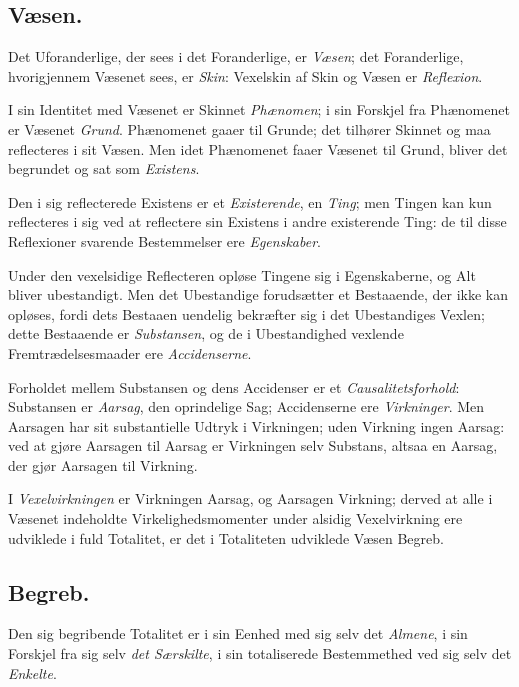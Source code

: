 \documentclass[12pt]{book}
\begin{document}
\subsection*{Væsen.}

Det Uforanderlige, der sees i det Foranderlige, er \emph{Væsen}; det
Foranderlige, hvorigjennem Væsenet sees, er \emph{Skin}: Vexelskin af Skin
og Væsen er \emph{Reflexion}.

I sin Identitet med Væsenet er Skinnet \emph{Phænomen}; i sin Forskjel
fra Phænomenet er Væsenet \emph{Grund}. Phænomenet gaaer til
Grunde; det tilhører Skinnet og maa reflecteres i sit Væsen. Men
idet Phænomenet faaer Væsenet til Grund, bliver det begrundet og sat
som \emph{Existens}.

Den i sig reflecterede Existens er et \emph{Existerende}, en \emph{Ting}; men
Tingen kan kun reflecteres i sig ved at reflectere sin Existens i andre
existerende Ting: de til disse Reflexioner svarende Bestemmelser ere
\emph{Egenskaber}.

Under den vexelsidige Reflecteren opløse Tingene sig i Egenskaberne,
og Alt bliver ubestandigt. Men det Ubestandige forudsætter et Bestaaende,
der ikke kan opløses, fordi dets Bestaaen uendelig bekræfter sig
i det Ubestandiges Vexlen; dette Bestaaende er \emph{Substansen}, og de i
Ubestandighed vexlende Fremtrædelsesmaader ere \emph{Accidenserne}.

Forholdet mellem Substansen og dens Accidenser er et \emph{Causalitetsforhold}:
Substansen er \emph{Aarsag}, den oprindelige Sag; Accidenserne
ere \emph{Virkninger}. Men Aarsagen har sit substantielle Udtryk
i Virkningen; uden Virkning ingen Aarsag: ved at gjøre Aarsagen til
Aarsag er Virkningen selv Substans, altsaa en Aarsag, der gjør Aarsagen
til Virkning.

I \emph{Vexelvirkningen} er Virkningen Aarsag, og Aarsagen Virkning;
derved at alle i Væsenet indeholdte Virkelighedsmomenter under
alsidig Vexelvirkning ere udviklede i fuld Totalitet, er det i Totaliteten
udviklede Væsen Begreb.

\subsection*{Begreb.}

Den sig begribende Totalitet er i sin Eenhed med sig selv det \emph{Almene},
i sin Forskjel fra sig selv \emph{det Særskilte}, i sin totaliserede
Bestemmethed ved sig selv det \emph{Enkelte}.
\end{document}
